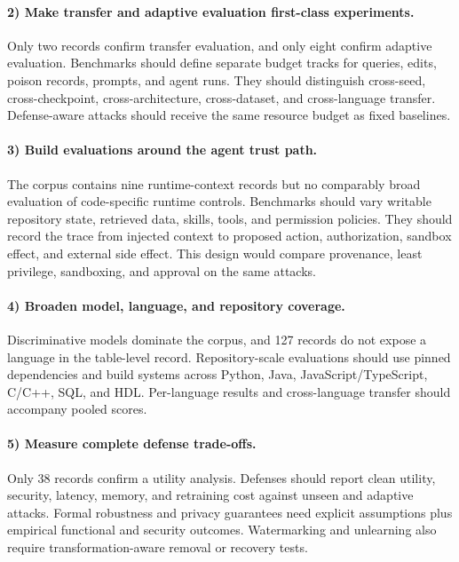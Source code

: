 \documentclass[acmsmall,screen,review]{acmart}
\begin{document}
\paragraph{2) Make transfer and adaptive evaluation first-class experiments.} Only two records confirm transfer evaluation, and only eight confirm adaptive evaluation. Benchmarks should define separate budget tracks for queries, edits, poison records, prompts, and agent runs. They should distinguish cross-seed, cross-checkpoint, cross-architecture, cross-dataset, and cross-language transfer. Defense-aware attacks should receive the same resource budget as fixed baselines.

\paragraph{3) Build evaluations around the agent trust path.} The corpus contains nine runtime-context records but no comparably broad evaluation of code-specific runtime controls. Benchmarks should vary writable repository state, retrieved data, skills, tools, and permission policies. They should record the trace from injected context to proposed action, authorization, sandbox effect, and external side effect. This design would compare provenance, least privilege, sandboxing, and approval on the same attacks.

\paragraph{4) Broaden model, language, and repository coverage.} Discriminative models dominate the corpus, and 127 records do not expose a language in the table-level record. Repository-scale evaluations should use pinned dependencies and build systems across Python, Java, JavaScript/TypeScript, C/C++, SQL, and HDL. Per-language results and cross-language transfer should accompany pooled scores.

\paragraph{5) Measure complete defense trade-offs.} Only 38 records confirm a utility analysis. Defenses should report clean utility, security, latency, memory, and retraining cost against unseen and adaptive attacks. Formal robustness and privacy guarantees need explicit assumptions plus empirical functional and security outcomes. Watermarking and unlearning also require transformation-aware removal or recovery tests.
\end{document}
